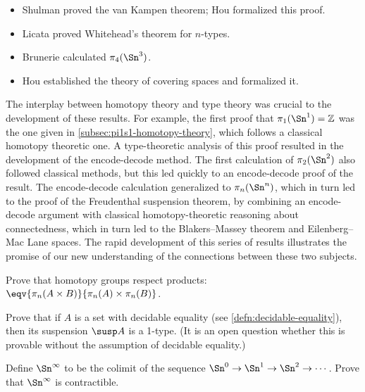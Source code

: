 {\begin{itemize}
\item
Shulman proved the van Kampen theorem; Hou formalized this proof.

\item
Licata proved Whitehead's theorem for $n$-types.

\item Brunerie calculated $\pi_4(\Sn ^3)$.

\item
Hou established the theory of covering spaces and formalized it.
\end{itemize}

The interplay between homotopy theory and type theory was crucial to the
development of these results.  For example, the first proof that
$\pi_1(\Sn ^1)=\mathbb{Z}$ was the one given in \cref{subsec:pi1s1-homotopy-theory}, which follows a classical homotopy theoretic one.  A
type-theoretic analysis of this proof resulted in the development of the
encode-decode method.  The first calculation of $\pi_2(\Sn ^2)$ also followed
classical methods, but this led quickly to an encode-decode proof of the
result.  The encode-decode calculation generalized to $\pi_n(\Sn ^n)$, which
in turn led to the proof of the Freudenthal suspension theorem, by
combining an encode-decode argument with classical homotopy-theoretic
reasoning about connectedness, which in turn led to the Blakers--Massey
theorem and Eilenberg--Mac Lane spaces.  The rapid development of this
series of results illustrates the promise of our new understanding of
the connections between these two subjects.

\sectionExercises

\begin{ex}\label{ex:homotopy-groups-resp-prod}
  Prove that homotopy groups respect products: $\eqv{\pi_n(A\times B)}{\pi_n(A)\times \pi_n(B)}$.
\end{ex}

\begin{ex}\label{ex:decidable-equality-susp}
  Prove that if $A$ is a set with decidable equality (see \cref{defn:decidable-equality}), then its suspension $\susp A$ is a 1-type.
  (It is an open question whether this is provable without the assumption of decidable equality.)
\end{ex}

\begin{ex}\label{ex:contr-infinity-sphere-colim}
  Define $\Sn^\infty$ to be the colimit of the sequence $\Sn^0 \to \Sn^1 \to \Sn^2 \to\cdots$.
  Prove that $\Sn^\infty$ is contractible.
\end{ex}

}
